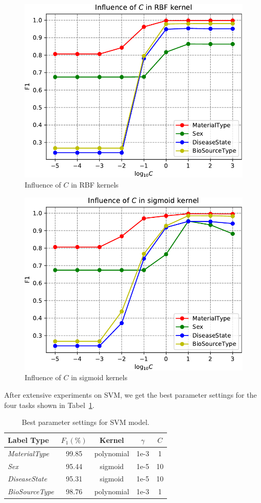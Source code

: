 \documentclass[sigconf]{acmart}
\begin{document}
\begin{figure}[h]
\centering
\includegraphics[width=0.8\linewidth]{../figs/C_rbf}
\caption{Influence of $C$ in RBF kernels}
\label{fig:C_rbf}
\end{figure}


\begin{figure}[h]
\centering
\includegraphics[width=0.8\linewidth]{../figs/C_sigmoid}
\caption{Influence of $C$ in sigmoid kernels}
\label{fig:C_sigmoid}
\end{figure}


After extensive experiments on SVM, we get the best parameter settings for the four tasks shown in Tabel~\ref{tab:SVM}.


	\begin{table}[tbp]
		\centering
		\begin{tabular}{l|cccc}
			\toprule
			{Label Type} & $F_1 (\%)$ & Kernel &$\gamma$ & $C$ \\
			\midrule
			{\textit{MaterialType}}&99.85 & polynomial &1e-3&1\\
			{\textit{Sex}}		& 95.44 & sigmoid    &1e-5&10 \\
			{\textit{DiseaseState}}& 95.31 & sigmoid &1e-5&10\\
			{\textit{BioSourceType}}& 98.76 & polynomial &1e-3&1\\
			\bottomrule	
		\end{tabular}
		\caption{Best parameter settings for SVM model. }
		\label{tab:SVM}
	\end{table}
\end{document}
